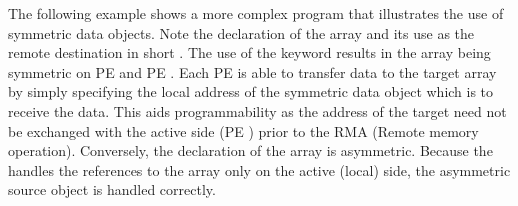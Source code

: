 The following example shows a more complex \openshmem program that illustrates the use of symmetric data objects. Note the declaration of the   array and its use as the remote destination in \openshmem short . The use of the  keyword results in the  array being symmetric on \ac{PE}  and \ac{PE} . Each \ac{PE} is able to transfer data to the target array by simply specifying the local address of the symmetric data object which is to receive the data. This aids programmability as the address of the target need not be exchanged with the active side (\ac{PE} ) prior to the RMA (Remote memory operation). Conversely, the declaration of the  array is asymmetric. Because the  handles the references to the  array only on the active (local) side, the asymmetric source object is handled correctly.

\begin{minipage}{\linewidth}
\vspace{0.1in}
\vspace{0.1in}
\end{minipage}
